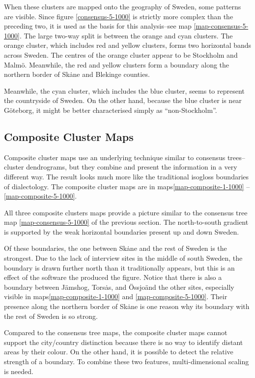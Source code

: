 When these clusters are mapped onto the geography of Sweden, some
patterns are visible. Since figure \ref{consensus-5-1000} is strictly
more complex than the preceding two, it is used as the basis for this
analysis--see map \ref{map-consensus-5-1000}. The large two-way split
is between the orange and cyan clusters. The orange cluster, which
includes red and yellow clusters, forms two horizontal bands across
Sweden. The centres of the orange cluster appear to be Stockholm and
Malm\"o. Meanwhile, the red and yellow clusters form a boundary along
the northern border of Sk\.ane and Blekinge counties.

Meanwhile, the cyan cluster, which includes the blue cluster, seems to
represent the countryside of Sweden. On the other hand, because the
blue cluster is near G\"oteborg, it might be better characterised
simply as ``non-Stockholm''.


\subsection{Composite Cluster Maps}

Composite cluster maps use an underlying technique similar to consensus
trees--cluster dendrograms, but they combine and present the information in
a very different way. The result looks much more like the traditional
isogloss boundaries of dialectology. The composite cluster maps are in
maps\ref{map-composite-1-1000} -- \ref{map-composite-5-1000}.

All three composite clusters maps provide a picture similar to the
consensus tree map \ref{map-consensus-5-1000} of the previous
section. The north-to-south gradient is supported by the
weak horizontal boundaries present up and down Sweden.

Of these boundaries, the one between Sk\.ane and the rest of Sweden is
the strongest. Due to the lack of interview sites in the middle of
south Sweden, the boundary is drawn further north than it
traditionally appears, but this is an effect of the software the
produced the figure. Notice that there is also a boundary between
J\"amshog, Tors\.as, and \"Ossjo\" and the other sites, especially
visible in maps\ref{map-composite-1-1000} and
\ref{map-composite-5-1000}. Their presence along the northern border
of Sk\.ane is one reason why its boundary with the rest of Sweden is
so strong.

Compared to the consensus tree maps, the composite cluster maps cannot
support the city/country distinction because there is no way to
identify distant areas by their colour. On the other hand, it is
possible to detect the relative strength of a boundary. To combine
these two features, multi-dimensional scaling is needed.

